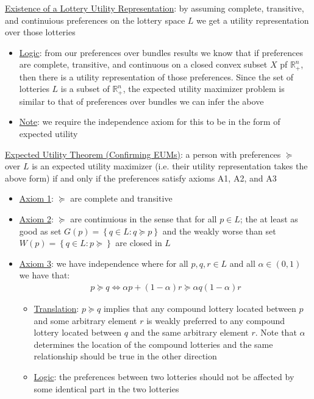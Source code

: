 \documentclass{article}
\begin{document}
  \par
  \underline{Existence of a Lottery Utility Representation}: by assuming complete, transitive, and continuious preferences on the lottery space $L$ we get a utility representation over those lotteries
  \begin{itemize}
    \item  \underline{Logic}: from our preferences over bundles results we know that if preferences are complete, transitive, and continuous on a closed convex subset $X$ pf $\mathbb{R}_{+}^{n}$, then there is a utility representation of those preferences. Since the set of lotteries $L$ is a subset of $\mathbb{R}_{+}^{n}$, the expected utility maximizer problem is similar to that of preferences over bundles we can infer the above
    \item  \underline{Note}: we require the independence axiom for this to be in the form of expected utility
  \end{itemize}
  \par
  \underline{Expected Utility Theorem (Confirming EUMs)}: a person with preferences $\succeq$ over $L$ is an expected utility maximizer (i.e. their utility representation takes the above form) if and only if the preferences satisfy axioms A1, A2, and A3
  \begin{itemize}
    \item  \underline{Axiom 1}: $\succeq$ are complete and transitive
    \item  \underline{Axiom 2}: $\succeq$ are continuious in the sense that for all $p \in L$; the at least as good as set $G(p) = \left\{ q \in L: q \succeq p \right\}$ and the weakly worse than set $W(p) = \left\{ q \in L: p \succeq \right\}$ are closed in $L$
    \item  \underline{Axiom 3}: we have independence where for all $p, q, r \in L$ and all $\alpha \in (0,1)$ we have that:
    \begin{gather*}
        p \succeq q \Leftrightarrow \alpha p + (1 - \alpha)r \succeq \alpha q (1 - \alpha)r
    \end{gather*}
    \begin{itemize}
      \item  \underline{Translation}: $p \succeq q$ implies that any compound lottery located between $p$ and some arbitrary element $r$ is weakly preferred to any compound lottery located between $q$ and the same arbitrary element $r$. Note that $\alpha$ determines the location of the compound lotteries and the same relationship should be true in the other direction
      \item  \underline{Logic}: the preferences between two lotteries should not be affected by some identical part in the two lotteries
    \end{itemize}
  \end{itemize}
\end{document}
